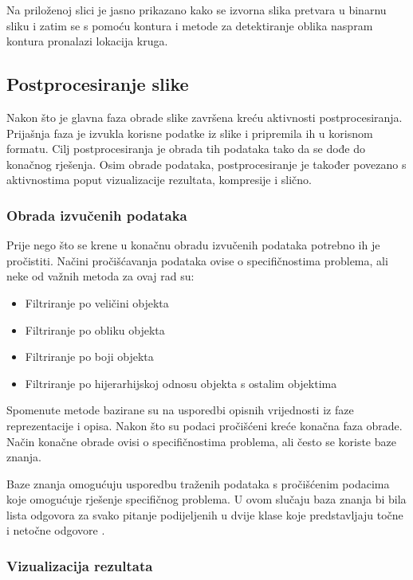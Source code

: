 \documentclass{foi}
\begin{document}
Na priloženoj slici je jasno prikazano kako se izvorna slika pretvara u binarnu sliku i zatim se s pomoću kontura i metode za detektiranje oblika naspram kontura pronalazi lokacija kruga.

\subsection{Postprocesiranje slike}

Nakon što je glavna faza obrade slike završena kreću aktivnosti postprocesiranja. Prijašnja faza je izvukla korisne podatke iz slike i pripremila ih u korisnom formatu. Cilj postprocesiranja je obrada tih podataka tako da se dođe do konačnog rješenja. Osim obrade podataka, postprocesiranje je također povezano s aktivnostima poput vizualizacije rezultata, kompresije i slično.

\subsubsection{Obrada izvučenih podataka}

\begin{flushleft}
    Prije nego što se krene u konačnu obradu izvučenih podataka potrebno ih je pročistiti. Načini pročišćavanja podataka ovise o specifičnostima problema, ali neke od važnih metoda za ovaj rad su:
\begin{itemize}
    \item Filtriranje po veličini objekta
    \item Filtriranje po obliku objekta
    \item Filtriranje po boji objekta
    \item Filtriranje po hijerarhijskoj odnosu objekta s ostalim objektima
\end{itemize}
\end{flushleft}

Spomenute metode bazirane su na usporedbi opisnih vrijednosti iz faze reprezentacije i opisa. Nakon što su podaci pročišćeni kreće konačna faza obrade. Način konačne obrade ovisi o specifičnostima problema, ali često se koriste baze znanja.

Baze znanja omogućuju usporedbu traženih podataka s pročišćenim podacima koje omogućuje rješenje specifičnog problema. U ovom slučaju baza znanja bi bila lista odgovora za svako pitanje podijeljenih u dvije klase koje predstavljaju točne i netočne odgovore \cite{ImageProcessing}. 

\subsubsection{Vizualizacija rezultata}
\end{document}
